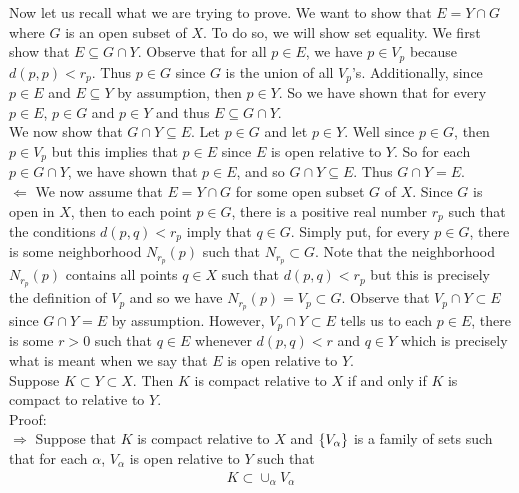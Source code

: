 \documentclass[12pt]{article}
\begin{document}
Now let us recall what we are trying to prove. We want to show that $E = Y \cap G$ where $G$ is an open subset of $X$. To do so, we will show set equality. We first show that  $E \subseteq G \cap Y$. Observe that for all $p \in E$, we have $p \in V_{p}$ because $d(p,p) < r_{p}$. Thus $p \in G$ since $G$ is the union of all $V_{p}$'s. Additionally, since $p \in E$ and $E \subseteq Y$ by assumption, then $p \in Y$. So we have shown that for every $p \in E$, $p \in G$ and $p \in Y$ and thus $E \subseteq G \cap Y$. \\ 

We now show that $G \cap Y \subseteq E$. Let $p \in G$ and let $p \in Y$. Well since $p \in G$, then $p \in V_{p}$ but this implies that $p \in E$ since $E$ is open relative to $Y$. So for each $p \in G \cap Y$, we have shown that $p \in E$, and so $G \cap Y \subseteq E$. Thus $G \cap Y = E$. \\

$\Leftarrow$ We now assume that $E = Y \cap G$ for some open subset $G$ of $X$. Since $G$ is open in $X$, then to each point $p \in G$, there is a positive real number $r_{p}$ such that the conditions $d(p,q)<r_{p}$ imply that $q \in G$. Simply put, for every $p \in G$, there is some neighborhood $N_{r_{p}}(p)$ such that $N_{r_{p}} \subset G$. Note that the neighborhood $N_{r_{p}}(p)$ contains all points $q \in X$ such that $d(p,q)<r_{p}$ but this is precisely the definition of $V_{p}$ and so we have $N_{r_{p}}(p) = V_{p} \subset G$. Observe that $V_{p} \cap Y \subset E$ since $G \cap Y = E$ by assumption. However, $V_{p} \cap Y \subset E$ tells us to each $p \in E$, there is some $r>0$ such that $q \in E$ whenever $d(p,q)<r$ and $q\in Y$ which is precisely what is meant when we say that $E$ is open relative to $Y$. \\ 

\problem Suppose $K \subset Y \subset X$. Then $K$ is compact relative to $X$ if and only if $K$ is compact to relative to $Y$. \\ 

Proof: \\

$\Rightarrow$ Suppose that $K$ is compact relative to $X$ and $\left\{V_{\alpha}\right\}$ is a family of sets such that for each $\alpha$, $V_{\alpha}$ is open relative to $Y$ such that 
\begin{align*}
K \subset \cup_{\alpha} V_{\alpha}
\end{align*}
\end{document}
